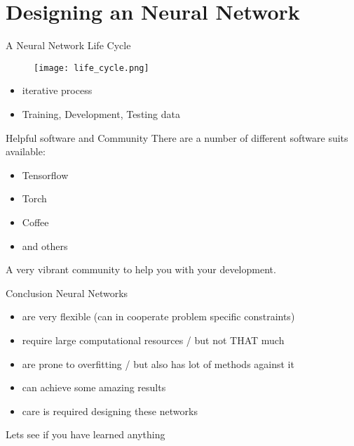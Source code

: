 \documentclass{beamer}
\begin{document}
\section{Designing an Neural Network}

\begin{frame}[t]{A Neural Network Life Cycle}
 \begin{figure}[htpb]
   \centering
   \texttt{[image: life\_cycle.png]}
 \end{figure} 
 \begin{itemize}
   \item iterative process
   \item Training, Development, Testing data 
 \end{itemize}
\end{frame}

\begin{frame}[t]{Helpful software and Community}
  There are a number of different software suits available:
  \begin{itemize}
    \item Tensorflow
    \item Torch
    \item Coffee
    \item and others
  \end{itemize}
  A very vibrant community to help you with your development.
\end{frame}

\begin{frame}[t]{Conclusion}
  Neural Networks
  \begin{itemize}
    \item are very flexible (can in cooperate problem specific constraints)
    \item require large computational resources / but not THAT much
    \item are prone to overfitting / but also has lot of methods against it
    \item can achieve some amazing results
    \item care is required designing these networks
  \end{itemize}
\end{frame}

\begin{frame}[c, plain]{}
  \begin{center}
    Lets see if you have learned anything
  \end{center}
\end{frame}
\end{document}
